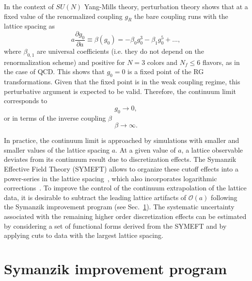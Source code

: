 In the context of $SU(N)$ Yang-Mills theory, perturbation theory shows that at a fixed value of the renormalized coupling $g_R$ the bare coupling runs with the lattice spacing as
\begin{equation}
\label{ch_foundation:eq:beta-func}
a\frac{\partial g_0}{\partial a}\equiv\beta(g_0)=-\beta_0g_0^3-\beta_1g_0^5+...,
\end{equation}
where $\beta_{0,1}$ are universal coefficients (i.e. they do not depend on the renormalization scheme) and positive for $N=3$ colors and $N_f\leq6$ flavors, as in the case of QCD. This shows that $g_0=0$ is a fixed point of the RG transformations. Given that the fixed point is in the weak coupling regime, this perturbative argument is expected to be valid. Therefore, the continuum limit corresponds to
\begin{equation}
g_0\rightarrow0,
\end{equation}
or in terms of the inverse coupling $\beta$
\begin{equation}
\beta\rightarrow\infty.
\end{equation}

In practice, the continuum limit is approached by simulations with smaller and smaller values of the lattice spacing $a$. At a given value of $a$, a lattice observable deviates from its continuum result due to discretization effects. The Symanzik Effective Field Theory (SYMEFT) allows to organize these cutoff effects into a power-series in the lattice spacing~\citep{Symanzik:1983dc, Symanzik:1983gh, Luscher:1984xn}, which also incorporates logarithmic corrections~\citep{Husung:2022kvi}. To improve the control of the continuum extrapolation of the lattice data, it is desirable to subtract the leading lattice artifacts of $\mathcal{O}(a)$ following the Symanzik improvement program (see Sec.~\ref{ch_foundation:sec:impr}). The systematic uncertainty associated with the remaining higher order discretization effects can be estimated by considering a set of functional forms derived from the SYMEFT and by applying cuts to data with the largest lattice spacing.


\section{Symanzik improvement program}
\label{ch_foundation:sec:impr}

